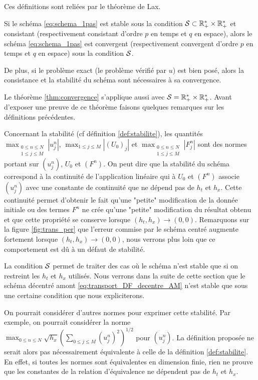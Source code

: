\documentclass[12pt,a4paper,twoside]{article}
\begin{document}
Ces d\'efinitions sont reli\'ees par le th\'eor\`eme de Lax.
\begin{theorem}
  \label{thm:convergence}
  Si le sch\'ema \eqref{eq:schema_1pas} est stable sous la condition
  $\mathcal{S} \subset \mathbb{R}_+^* \times \mathbb{R}_+^*$ et consistant 
  (respectivement consistant d'ordre $p$ en temps et $q$ en espace),
  alors le sch\'ema \eqref{eq:schema_1pas} est convergent
  (respectivement convergent d'ordre $p$ en temps et $q$ en espace)
  sous la condition $\mathcal{S}$.


  De plus, si le probl\`eme exact (le probl\`eme v\'erifi\'e par $u$) 
  est bien pos\'e, alors la consistance et la stabilit\'e du sch\'ema 
  sont n\'ecessaires \`a sa convergence.
\end{theorem}
Le th\'eor\`eme \ref{thm:convergence} s'applique aussi avec $\mathcal{S} = \mathbb{R}_+^* \times \mathbb{R}_+^*$.
Avant d'exposer une preuve de ce th\'eor\`eme 
faisons quelques remarques sur les d\'efinitions pr\'ec\'edentes.


Concernant la stabilit\'e (cf d\'efinition \ref{def:stabilite}),
les quantit\'es $\max_{\substack{0\leq n \leq N\\ 1 \leq j \leq M}} | u_j^n |$, 
$\max_{1\leq j \leq M} | (U_0)_j |$ et $\max_{\substack{0\leq n \leq N\\ 1 \leq j \leq M}} | F_j^n |$ 
sont des normes portant sur $(u_j^n)$, $U_0$ et $(F^n)$.
On peut dire que la stabilit\'e du sch\'ema correspond \`a
la continuit\'e de l'application lin\'eaire qui \`a 
$U_0$ et $(F^n)$ associe $(u_j^n)$ 
avec une constante de continuit\'e que ne d\'epend pas
de $h_t$ et $h_x$.
Cette continuit\'e permet d'obtenir le fait qu'une "petite"
modification de la donn\'ee initiale ou des termes $F^n$
ne cr\'ee qu'une "petite" modification
du r\'esultat obtenu et que cette propri\'et\'e se conserve lorsque
$(h_t,h_x) \to (0,0)$.
Remarquons sur la figure \ref{fig:trans_per} que l'erreur commise
par le sch\'ema centr\'e augmente fortement lorsque
$(h_t,h_x) \to (0,0)$, nous verrons plus loin que ce comportement
est d\^u \`a un d\'efaut de stabilit\'e.


La condition $\mathcal{S}$ permet de traiter des cas o\`u le sch\'ema
n'est stable que si on restreint les $h_t$ et $h_x$ utilis\'es.
Nous verrons dans la suite de cette section que le sch\'ema 
d\'ecentr\'e amont \eqref{eq:transport_DF_decentre_AM} 
n'est stable que sous une certaine condition
que nous expliciterons.


On pourrait consid\'erer d'autres normes pour exprimer cette stabilit\'e.
Par exemple, on pourrait consid\'erer la norme
$\max_{0\leq n \leq N} \sqrt{h_x} (\sum_{0\leq j \leq M} (u_j^n)^2)^{1/2}$
pour $(u_j^n)$.
La d\'efinition propos\'ee ne serait alors pas n\'ecessairement
\'equivalente \`a celle de la d\'efinition \ref{def:stabilite}.
En effet, si toutes les normes sont \'equivalentes en dimension
finie, rien ne prouve que les constantes de la relation
d'\'equivalence ne d\'ependent pas de $h_t$ et $h_x$.
\end{document}
